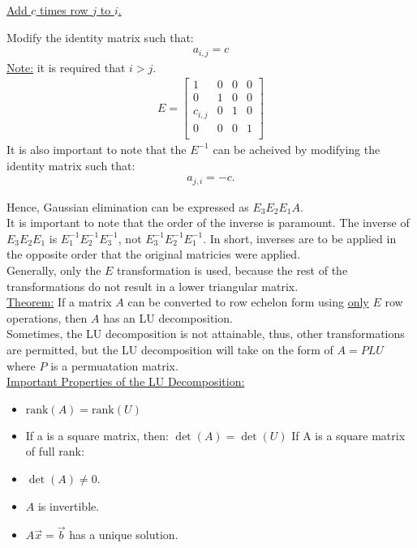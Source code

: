 \documentclass{article}
\newcommand{\gap}{\medskip\\}
\newcommand{\centertext}[1]{\begin{center}#1\end{center}}
\begin{document}
\begin{multicols}{3}
        \centertext{\underline{Add $c$ times row $j$ to $i$.}}
        Modify the identity matrix such that:
        \begin{align*}
            a_{i,j} = c
        \end{align*}
        \underline{Note:} it is required that $i > j$.
        \begin{align*}
            E = \begin{bmatrix}
                1 & 0 & 0 & 0\\
                0 & 1 & 0 & 0\\
                c_{i,j} & 0 & 1 & 0\\
                0 & 0 & 0 & 1\\
            \end{bmatrix}
        \end{align*}
        It is also important to note that the $E^{-1}$ can be acheived by modifying
        the identity matrix such that:
        \begin{align*}
            a_{j, i} = -c.
        \end{align*}
    \end{multicols}
    Hence, Gaussian elimination can be expressed as $E_3E_2E_1A$.
    \gap
    It is important to note that the order of the inverse is paramount. The inverse
    of $E_3E_2E_1$ is $E_1^{-1}E_2^{-1}E_3^{-1}$, not $E_3^{-1}E_2^{-1}E_1^{-1}$.
    In short, inverses are to be applied in the opposite order that the original
    matricies were applied.
    \gap
    Generally, only the $E$ transformation is used, because the rest of the transformations
    do not result in a lower triangular matrix.
    \gap
    \underline{Theorem:} If a matrix $A$ can be converted to row echelon form using
    \underline{only} $E$ row operations, then $A$ has an LU decomposition.
    \gap
    Sometimes, the LU decomposition is not attainable, thus, other transformations
    are permitted, but the LU decomposition will take on the form of $A=PLU$ where $P$
    is a permuatation matrix.
    \gap

    \underline{Important Properties of the LU Decomposition:}
    \begin{itemize}
        \item $\textrm{rank}(A) = \textrm{rank}(U)$
        \item If a is a square matrix, then: $\det(A) = \det(U)$
        If A is a square matrix of full rank:
        \item $\det(A) \neq 0$.
        \item $A$ is invertible.
        \item $A\vec{x} = \vec{b}$ has a unique solution.
    \end{itemize}
\end{document}
